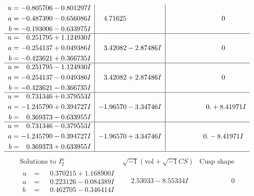 \documentclass[1p]{elsarticle_modified}
\theoremstyle{definition}
\newcommand{\I}{\sqrt{-1}}
\begin{document}
$$\begin{array}{c|c|c}
\begin{aligned}
u &= -0.805706 - 0.801297 I \\
a &= -0.487390 - 0.656086 I \\
b &= -0.193006 - 0.633975 I\end{aligned}
 & \phantom{-}4.71625\phantom{ +0.000000I} & \phantom{-0.000000 } 0 \\ \hline\begin{aligned}
u &= \phantom{-}0.251795 + 1.124930 I \\
a &= -0.254137 + 0.049386 I \\
b &= -0.423621 + 0.366735 I\end{aligned}
 & \phantom{-}3.42082 - 2.87486 I & \phantom{-0.000000 } 0 \\ \hline\begin{aligned}
u &= \phantom{-}0.251795 - 1.124930 I \\
a &= -0.254137 - 0.049386 I \\
b &= -0.423621 - 0.366735 I\end{aligned}
 & \phantom{-}3.42082 + 2.87486 I & \phantom{-0.000000 } 0 \\ \hline\begin{aligned}
u &= \phantom{-}0.731346 + 0.379553 I \\
a &= -1.245790 + 0.394727 I \\
b &= \phantom{-}0.369373 - 0.633955 I\end{aligned}
 & -1.96570 - 3.34746 I & \phantom{-0.000000 -}0. + 8.41971 I \\ \hline\begin{aligned}
u &= \phantom{-}0.731346 - 0.379553 I \\
a &= -1.245790 - 0.394727 I \\
b &= \phantom{-}0.369373 + 0.633955 I\end{aligned}
 & -1.96570 + 3.34746 I & \phantom{-0.000000 } 0. - 8.41971 I\\
 \hline 
 \end{array}$$\newpage$$\begin{array}{c|c|c}  
\text{Solutions to }I^u_{2}& \I (\text{vol} + \sqrt{-1}CS) & \text{Cusp shape}\\
 \hline 
\begin{aligned}
u &= \phantom{-}0.370215 + 1.168900 I \\
a &= \phantom{-}0.223126 - 0.084389 I \\
b &= \phantom{-}0.462705 - 0.346414 I\end{aligned}
 & \phantom{-}2.53033 - 8.55334 I & \phantom{-0.000000 } 0 \\ \hline\begin{aligned}

\end{aligned}
\end{array}$$
\end{document}
